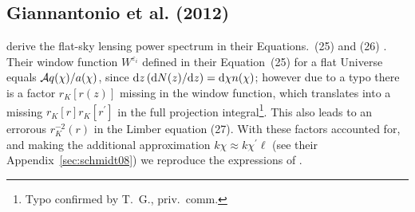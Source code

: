 \documentclass[fleqn,usenatbib]{mnras} %
\newcommand{\pref}{{\cal A}}
\begin{document}
\begin{appendix}
\subsection{Giannantonio et al. (2012)}
\label{sec:giannantonio12}
\cite{2012MNRAS.422.2854G} derive the flat-sky lensing
power spectrum in their Equations.~(25) and (26) . Their window function $W^{\varepsilon_i}$ defined in their Equation~(25) for a
flat Universe equals $\pref q(\chi) / a(\chi)$, since ${\rm d} z \,
({\rm d} N(z)/{\rm d} z) = {\rm d} \chi n(\chi)$; however due to a typo there
is a factor $r_K[r(z)]$ missing in the window function, which translates into a
missing $r_K[r] r_K[r^\prime]$ in the full projection integral\footnote{Typo
confirmed by T.~G., priv.~comm.}. This also leads to an errorous $r_K^{-2}(r)$
in the Limber equation (27). With these factors accounted for, and making the
additional approximation $k \chi \approx k \chi^\prime \ell$ (see their
Appendix~\ref{sec:schmidt08}) we reproduce the expressions of
\cite{2012MNRAS.422.2854G}.


\label{lastpage}

\end{appendix}
\end{document}
